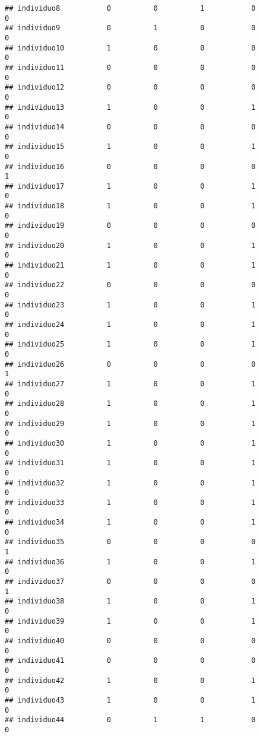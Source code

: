 \documentclass[
]{article}
\begin{document}
\begin{verbatim}
## individuo8           0          0          1           0           0
## individuo9           0          1          0           0           0
## individuo10          1          0          0           0           0
## individuo11          0          0          0           0           0
## individuo12          0          0          0           0           0
## individuo13          1          0          0           1           0
## individuo14          0          0          0           0           0
## individuo15          1          0          0           1           0
## individuo16          0          0          0           0           1
## individuo17          1          0          0           1           0
## individuo18          1          0          0           1           0
## individuo19          0          0          0           0           0
## individuo20          1          0          0           1           0
## individuo21          1          0          0           1           0
## individuo22          0          0          0           0           0
## individuo23          1          0          0           1           0
## individuo24          1          0          0           1           0
## individuo25          1          0          0           1           0
## individuo26          0          0          0           0           1
## individuo27          1          0          0           1           0
## individuo28          1          0          0           1           0
## individuo29          1          0          0           1           0
## individuo30          1          0          0           1           0
## individuo31          1          0          0           1           0
## individuo32          1          0          0           1           0
## individuo33          1          0          0           1           0
## individuo34          1          0          0           1           0
## individuo35          0          0          0           0           1
## individuo36          1          0          0           1           0
## individuo37          0          0          0           0           1
## individuo38          1          0          0           1           0
## individuo39          1          0          0           1           0
## individuo40          0          0          0           0           0
## individuo41          0          0          0           0           0
## individuo42          1          0          0           1           0
## individuo43          1          0          0           1           0
## individuo44          0          1          1           0           0

\end{verbatim}
\end{document}
